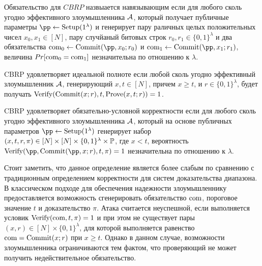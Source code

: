 
\begin{definition}
	Обязательство для $CBRP$ назвыается навязывающим если для любого сколь угодно эффективного злоумышленника $\A$, который получает публичные параметры $\pp \leftarrow \Setup(1^\lambda)$ и генерирует пару раличных целых положительных чисел $x_0, x_1 \in [N]$, пару случйаный битовых строк $r_0, r_1 \in \{0, 1\}^\lambda$ и два обязательства $\com_0 \leftarrow \Commit(\pp, x_0; r_0)$ и $\com_1 \leftarrow \Commit(\pp, x_1; r_1)$, величина $Pr[\com_0 = \com_1]$ незначительна по отношению к $\lambda$.
\end{definition}

\begin{definition}
	CBRP удовлетворяет идеальной полноте если любой сколь угодно эффективный злоумышленник $\A$, генерирующий $x, t \in [N]$, причем  $x \geq t$, и $r \in \{0, 1\}^\lambda$, будет получать $\Verify(\Commit(x; r), t, \Prove(x, t; r)) = 1$.
\end{definition}

\begin{definition}
	\label{definition:3}
	CBRP удовлетворяет обязательно-условной корректности если для любого сколь угодно эффективного злоумышленника $\A$, который на основе публичных параметров $\pp \leftarrow \Setup(1^\lambda)$ генерирует набор $(x, t, r, \pi) \in [N] \times [N] \times \{0, 1\}^\lambda \times \P$, где $x < t$, вероятность $\Verify(\pp, \Commit(\pp, x; r), t, \pi) = 1$ незначительна по отношению к $\lambda$.
\end{definition}

Стоит заметить, что данное определение является более слабым по сравнению с традиционным определением корректности для систем доказательства диапазона.
В классическом подходе для обеспечения надежности злоумышленнику предоставляется возможность сгенерировать обязательство $\com$, пороговое значение $t$ и доказательство $\pi$.
Атака считается неуспешной, если выполняется условик $\Verify(\com, t, \pi) = 1$ и при этом не существует пары $(x, r) \in [N] \times \{0, 1\}^\lambda$, для которой выполняется равенство $\com = \Commit(x; r)$ при $x \geq t$.
Однако в данном случае, возможности злоумышленника ограничиваются тем фактом, что проверяющий не может получить недействительное обязательство.

